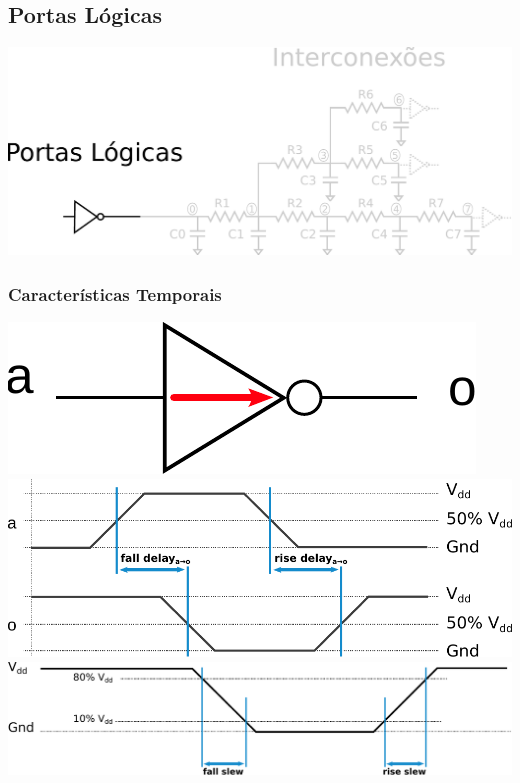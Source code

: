 \documentclass[10pt,a4paper]{beamer}
\begin{document}
		\subsection*{Portas Lógicas}
			\begin{frame}
				\begin{center}
					\includegraphics[width=\textwidth]{img/circuito_portas.pdf} 
				\end{center}
			\end{frame}
			
			\begin{frame}
				\frametitle{Características Temporais}
				\begin{center}
					\includegraphics[width=0.3 \textwidth]{img/carac_portas_1.pdf} \\ \pause
					\includegraphics[width=0.8 \textwidth]{img/carac_portas_2.pdf} \\ \vspace{.5cm} \pause
					\includegraphics[width=0.8 \textwidth]{img/carac_portas_3.pdf}  
				\end{center}
				
			\end{frame}
			
\end{document}

